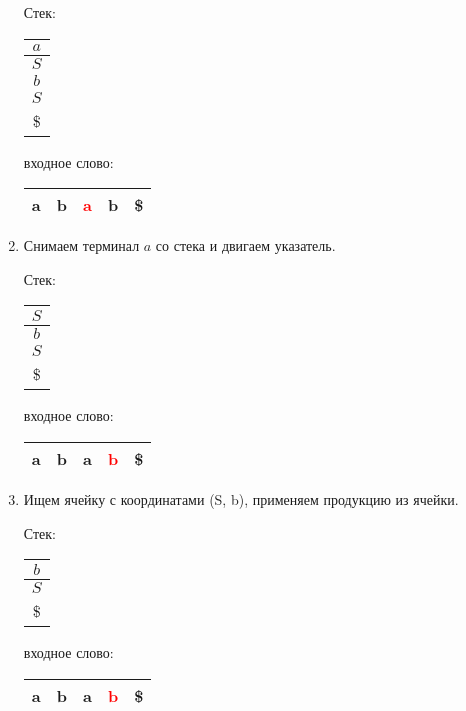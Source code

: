 \begin{example}
\begin{enumerate}
    Стек: \,
    \begin{tabular}[c]{ |c| }
        \\ \hline
        $a$ \\ \hline
        $S$ \\ \hline
        $b$ \\ \hline
        $S$ \\ \hline
        \$ \\ \hline
    \end{tabular}
    \qquad  \qquad \qquad  \qquad входное слово: \,
    \begin{tabular}[c]{ |c|c|c|c|c| }
        \hline
        a & b & \textcolor{red}{a} & b & \$ \\ \hline
    \end{tabular}

\item Снимаем терминал $a$ со стека и двигаем указатель.

    Стек: \,
    \begin{tabular}[c]{ |c| }
        \\ \hline
        $S$ \\ \hline
        $b$ \\ \hline
        $S$ \\ \hline
        \$ \\ \hline
    \end{tabular}
    \qquad  \qquad \qquad  \qquad входное слово: \,
    \begin{tabular}[c]{ |c|c|c|c|c| }
        \hline
        a & b & a & \textcolor{red}{b} & \$ \\ \hline
    \end{tabular}

\item Ищем ячейку с координатами (S, b), применяем продукцию из ячейки.

    Стек: \,
    \begin{tabular}[c]{ |c| }
        \\ \hline
        $b$ \\ \hline
        $S$ \\ \hline
        \$ \\ \hline
    \end{tabular}
    \qquad  \qquad \qquad  \qquad входное слово: \,
    \begin{tabular}[c]{ |c|c|c|c|c| }
        \hline
        a & b & a & \textcolor{red}{b} & \$ \\ \hline
    \end{tabular}


\end{enumerate}
\end{example}
